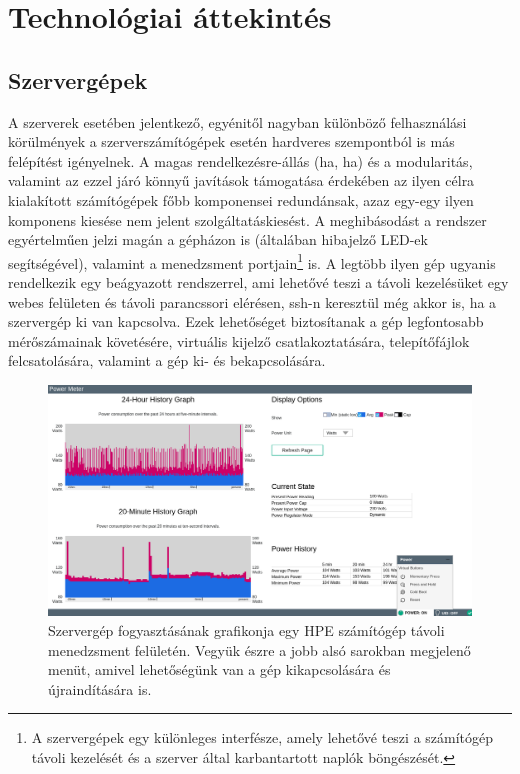 
\chapter{Technológiai áttekintés}
\label{chap:technologies}

\section{Szervergépek}
\label{sect:servers}
A szerverek esetében jelentkező, egyénitől nagyban különböző felhasználási körülmények a szerverszámítógépek esetén hardveres szempontból is más felépítést igényelnek. A magas rendelkezésre-állás (\acrlong{ha}, \acrshort{ha}) és a modularitás, valamint az ezzel járó könnyű javítások támogatása érdekében az ilyen célra kialakított számítógépek főbb komponensei redundánsak, azaz egy-egy ilyen komponens kiesése nem jelent szolgáltatáskiesést. A meghibásodást a rendszer egyértelműen jelzi magán a gépházon is (általában hibajelző LED-ek segítségével), valamint a menedzsment portjain\footnote{A szervergépek egy különleges interfésze, amely lehetővé teszi a számítógép távoli kezelését és a szerver által karbantartott naplók böngészését.} is. A legtöbb ilyen gép ugyanis rendelkezik egy beágyazott rendszerrel, ami lehetővé teszi a távoli kezelésüket egy webes felületen és távoli parancssori elérésen, \acrshort{ssh}-n keresztül még akkor is, ha a szervergép ki van kapcsolva. Ezek lehetőséget biztosítanak a gép legfontosabb mérőszámainak követésére, virtuális kijelző csatlakoztatására, telepítőfájlok felcsatolására, valamint a gép ki- és bekapcsolására.

\begin{figure}[!ht]
	\centering
	\includegraphics[width=150mm, keepaspectratio]{figures/ilo-power1.png}
	\caption{Szervergép fogyasztásának grafikonja egy HPE számítógép távoli menedzsment felületén. Vegyük észre a jobb alsó sarokban megjelenő menüt, amivel lehetőségünk van a gép kikapcsolására és újraindítására is.}
	\label{fig:ilopowerchart}
\end{figure}

